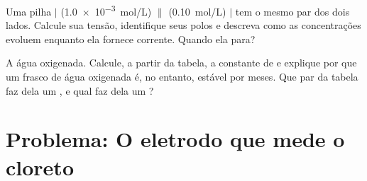 \begin{exercise}[$\star\star\star$]\label{exo:b1:nernst:11}
Uma pilha  $|$  (\qty{1.0e-3}{mol/L}) $\|$ 
(\qty{0.10}{mol/L}) $|$  tem o mesmo par dos dois lados. Calcule
sua tensão, identifique seus polos e descreva como as concentrações
evoluem enquanto ela fornece corrente. Quando ela para?
\end{exercise}

\begin{exercise}[$\star\star\star$]\label{exo:b1:nernst:12}
A água oxigenada. Calcule, a partir da tabela, a constante de
 e explique por que um frasco de água oxigenada
é, no entanto, estável por meses. Que par da tabela faz dela um
, e qual faz dela um ?
\end{exercise}

\section{Problema: O eletrodo que mede o cloreto}

